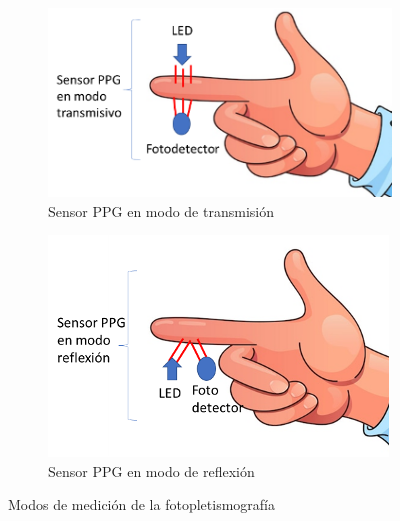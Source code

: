             \begin{figure}[H]
                \centering
                \begin{subfigure}[b]{0.45\linewidth}
                    \includegraphics[width=\linewidth]{img/PPG_transmisivo.png}
                    \caption{Sensor PPG en modo de transmisión}
                    \label{fig:PPG_transmisivo}
                \end{subfigure}
                \begin{subfigure}[b]{0.45\linewidth}
                    \includegraphics[width=\linewidth]{img/PPG_reflexion.png}
                    \caption{Sensor PPG en modo de reflexión}
                    \label{fig:PPG_reflexion}
                \end{subfigure}
                \caption[Modos de medición de la fotopletismografía]{Modos de medición de la fotopletismografía\footnotemark}
                \label{fig:modosMedicionPPG}
            \end{figure}

